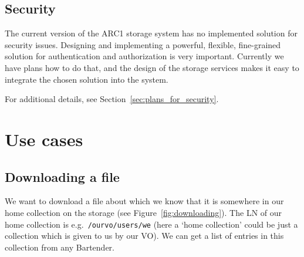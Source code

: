 \documentclass{book}
\begin{document}

\section{Security} %
\label{sec:security}

The current version of the ARC1 storage system has no implemented solution for security issues. Designing and implementing a powerful, flexible, fine-grained solution for authentication and authorization is very important. Currently we have plans how to do that, and the design of the storage services makes it easy to integrate the chosen solution into the system.

For additional details, see Section~\ref{sec:plans_for_security}.



\chapter{Use cases} %
\label{cha:use_cases}

\section{Downloading a file} %
\label{sec:downloading_a_file}
\begin{figure}[ht]
\end{figure}

We want to download a file about which we know that it is somewhere in our home collection on the storage (see Figure~\ref{fig:downloading}). The LN of our home collection is e.g.~\verb#/ourvo/users/we# (here a `home collection' could be just a collection which is given to us by our VO). We can get a list of entries in this collection from any Bartender.
\end{document}
